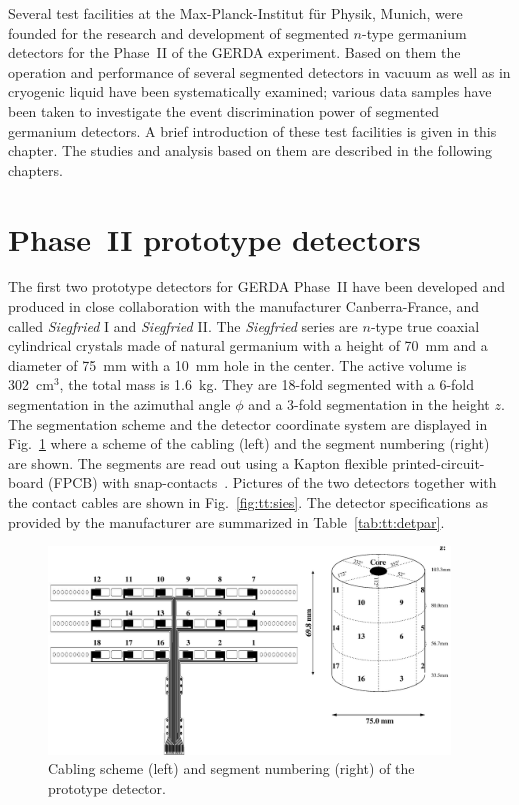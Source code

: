 Several test facilities at the Max-Planck-Institut f\"ur Physik, Munich, were founded for the research and development of segmented $n$-type germanium detectors for the Phase~II of the GERDA experiment. Based on them the operation and performance of several segmented detectors in vacuum as well as in cryogenic liquid have been systematically examined; various data samples have been taken to investigate the event discrimination power of segmented germanium detectors. A brief introduction of these test facilities is given in this chapter. The studies and analysis based on them are described in the following chapters.

\section{Phase~II prototype detectors} 
\label{sec:tt:dets} 
The first two prototype detectors for GERDA Phase~II have been developed and produced in close collaboration with the manufacturer Canberra-France, and called \emph{Siegfried} I and \emph{Siegfried} II. The \emph{Siegfried} series are $n$-type true coaxial cylindrical crystals made of natural germanium with a height of 70~mm and a diameter of 75~mm with a 10~mm hole in the center. The active volume is 302~cm$^{3}$, the total mass is 1.6~kg. They are 18-fold segmented with a 6-fold segmentation in the azimuthal angle $\phi$ and a 3-fold segmentation in the height $z$.  The segmentation scheme and the detector coordinate system are displayed in Fig.~\ref{fig:tt:segm} where a scheme of the cabling (left) and the segment numbering (right) are shown. The segments are read out using a Kapton flexible printed-circuit-board (FPCB) with snap-contacts~\cite{Sie07}. Pictures of the two detectors together with the contact cables are shown in Fig.~\ref{fig:tt:sies}. The detector specifications as provided by the
\mbox{manufacturer} are summarized in
Table~\ref{tab:tt:detpar}. 
\begin{figure}[tbhp]
  \centering
  \includegraphics[width=0.95\textwidth]{segmentation_scheme}  
  \caption{Cabling scheme (left) and segment numbering (right) of the     prototype detector.}
  \label{fig:tt:segm}
\end{figure}

